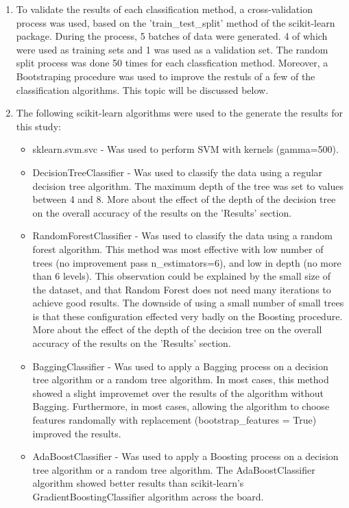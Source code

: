 \documentclass[10pt,twocolumn]{article}
\begin{document}
\begin{enumerate}
  \item To validate the results of each classification method, a cross-validation process was used, based on the 'train\_test\_split' method of the scikit-learn package. During the process, 5 batches of data were generated. 4 of which were used as training sets and 1 was used as a validation set. The random split process was done 50 times for each classfication method. Moreover, a Bootstraping procedure was used to improve the restuls of a few of the classification algorithms. This topic will be discussed below.

  \item The following scikit-learn algorithms were used to the generate the results for this study:
    \begin{itemize}
      \item sklearn.svm.svc - Was used to perform SVM with kernels (gamma=500).
      \item DecisionTreeClassifier - Was used to classify the data using a regular decision tree algorithm. The maximum depth of the tree was set to values between 4 and 8. More about the effect of the depth of the decision tree on the overall accuracy of the results on the 'Results' section.
      \item RandomForestClassifier - Was used to classify the data using a random forest algorithm. This method was most effective with low number of trees (no improvement pass n\_estimators=6), and low in depth (no more than 6 levels). This observation could be explained by the small size of the dataset, and that Random Forest does not need many iterations to achieve good results. The downside of using a small number of small trees is that these configuration effected very badly on the Boosting procedure. More about the effect of the depth of the decision tree on the overall accuracy of the results on the 'Results' section.
      \item BaggingClassifier - Was used to apply a Bagging process on a decision tree algorithm or a random tree algorithm. In most cases, this method showed a slight improvemet over the results of the algorithm without Bagging. Furthermore, in most cases, allowing the algorithm to choose features randomally with replacement (bootstrap\_features = True) improved the results.
      \item AdaBoostClassifier - Was used to apply a Boosting process on a decision tree algorithm or a random tree algorithm. The AdaBoostClassifier algorithm showed better results than scikit-learn's GradientBoostingClassifier algorithm across the board.
    \end{itemize}


\end{enumerate}
\end{document}
